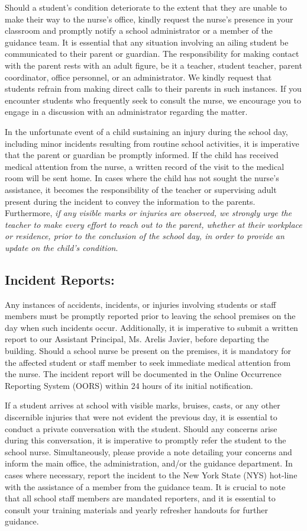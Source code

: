 \documentclass[11pt, letterpaper]{article}
\begin{document}
Should a student's condition deteriorate to the extent that they are unable to make their way to the nurse's office, kindly request the nurse's presence in your classroom and promptly notify a school administrator or a member of the guidance team. It is essential that any situation involving an ailing student be communicated to their parent or guardian. The responsibility for making contact with the parent rests with an adult figure, be it a teacher, student teacher, parent coordinator, office personnel, or an administrator. We kindly request that students refrain from making direct calls to their parents in such instances. If you encounter students who frequently seek to consult the nurse, we encourage you to engage in a discussion with an administrator regarding the matter.

In the unfortunate event of a child sustaining an injury during the school day, including minor incidents resulting from routine school activities, it is imperative that the parent or guardian be promptly informed. If the child has received medical attention from the nurse, a written record of the visit to the medical room will be sent home. In cases where the child has not sought the nurse's assistance, it becomes the responsibility of the teacher or supervising adult present during the incident to convey the information to the parents. Furthermore, \textit{if any visible marks or injuries are observed, we strongly urge the teacher to make every effort to reach out to the parent, whether at their workplace or residence, prior to the conclusion of the school day, in order to provide an update on the child's condition}.
\subsection{Incident Reports:}
Any instances of accidents, incidents, or injuries involving students or staff members must be promptly reported prior to leaving the school premises on the day when such incidents occur. Additionally, it is imperative to submit a written report to our Assistant Principal, Ms. Arelis Javier, before departing the building. Should a school nurse be present on the premises, it is mandatory for the affected student or staff member to seek immediate medical attention from the nurse. The incident report will be documented in the Online Occurrence Reporting System (OORS) within 24 hours of its initial notification.

If a student arrives at school with visible marks, bruises, casts, or any other discernible injuries that were not evident the previous day, it is essential to conduct a private conversation with the student. Should any concerns arise during this conversation, it is imperative to promptly refer the student to the school nurse. Simultaneously, please provide a note detailing your concerns and inform the main office, the administration, and/or the guidance department. In cases where necessary, report the incident to the New York State (NYS) hot-line with the assistance of a member from the guidance team. It is crucial to note that all school staff members are mandated reporters, and it is essential to consult your training materials and yearly refresher handouts for further guidance.
\end{document}
